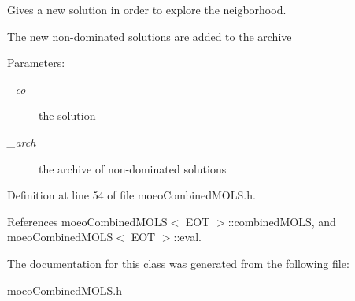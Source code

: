 Gives a new solution in order to explore the neigborhood. 

The new non-dominated solutions are added to the archive \begin{Desc}
\item[Parameters:]
\begin{description}
\item[{\em \_\-eo}]the solution \item[{\em \_\-arch}]the archive of non-dominated solutions \end{description}
\end{Desc}


Definition at line 54 of file moeo\-Combined\-MOLS.h.

References moeo\-Combined\-MOLS$<$ EOT $>$::combined\-MOLS, and moeo\-Combined\-MOLS$<$ EOT $>$::eval.

The documentation for this class was generated from the following file:\begin{CompactItemize}
\item 
moeo\-Combined\-MOLS.h\end{CompactItemize}
